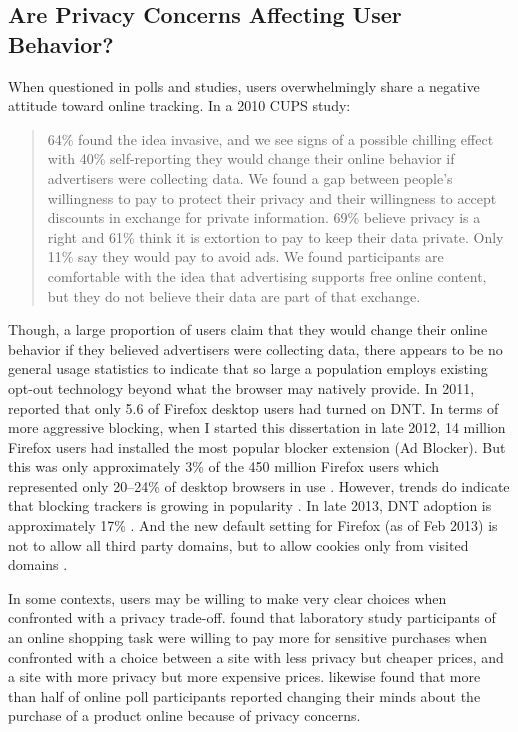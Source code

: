 \subsection{Are Privacy Concerns Affecting User Behavior?}
\label{areprivacyconcernsaffectinguserbehavior}

When questioned in polls and studies, users overwhelmingly share a negative attitude toward online tracking. In a 2010 CUPS study:

\begin{quote}
64\% found the idea invasive, and we see signs of a possible chilling effect with 40\% self-reporting they would change their online behavior if advertisers were collecting data. We found a gap between people's willingness to pay to protect their privacy and their willingness to accept discounts in exchange for private information. 69\% believe privacy is a right and 61\% think it is extortion to pay to keep their data private. Only 11\% say they would pay to avoid ads. We found participants are comfortable with the idea that advertising supports free online content, but they do not believe their data are part of that exchange. \citep{McDonald:2010wt}
\end{quote}

Though, a large proportion of users claim that they would change their online behavior if they believed advertisers were collecting data, there appears to be no general usage statistics to indicate that so large a population employs existing opt-out technology beyond what the browser may natively provide. In 2011,  \cite{Fowler:vx}  reported that only 5.6 of Firefox desktop users had turned on DNT. In terms of more aggressive blocking, when I started this dissertation in late 2012, 14 million Firefox users had installed the most popular blocker extension (Ad Blocker). But this was only approximately 3\% of the 450 million Firefox users which represented only 20--24\% of desktop browsers in use  \citep{Anonymous:KXG0mTUq, Anonymous:K3r7zLAx}.  However, trends do indicate that blocking trackers is growing in popularity  \citep{Acohido:2011ta}.  In late 2013, DNT adoption is approximately 17\% \citep{Fowler:dnt}.  And the new default setting for Firefox (as of Feb 2013) is not to allow all third party domains, but to allow cookies only from visited domains  \citep{Fowler:2013}. 

In some contexts, users may be willing to make very clear choices when confronted with a privacy trade-off.  \cite{Egelman:2009ut}  found that laboratory study participants of an online shopping task were willing to pay more for sensitive purchases when confronted with a choice between a site with less privacy but cheaper prices, and a site with more privacy but more expensive prices.  \cite{Hoofnagle:vy}  likewise found that more than half of online poll participants reported changing their minds about the purchase of a product online because of privacy concerns.

